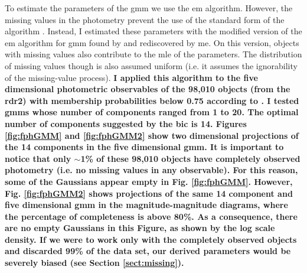 To estimate the parameters of the \gls{gmm} we use the \gls{em} algorithm. However, the missing values in the photometry prevent the use of the standard form of the algorithm \cite[see for example Chapter 9 of][]{Bishop2006}.
Instead, I estimated these parameters with the modified version of the \gls{em} algorithm for \gls{gmm} found by \citet{McMichael1996} and rediscovered by me. On this version, objects with missing values also contribute to the \gls{mle} of the parameters. The distribution of missing values though is also assumed uniform (i.e. it assumes the ignorability of the missing-value process). \textbf{I applied this algorithm to the five dimensional photometric observables of the 98,010 objects (from the \gls{rdr2}) with membership probabilities below 0.75 according to \citet{Bouy2015}. I tested \glspl{gmm} whose number of components ranged from 1 to 20. The optimal number of components suggested by the \gls{bic} is 14. Figures \ref{fig:fphGMM} and \ref{fig:fphGMM2} show two dimensional projections of the 14 components in the five dimensional \gls{gmm}. It is important to notice that only $\sim$1\% of these 98,010 objects have completely observed photometry (i.e. no missing values in any observable). For this reason, some of the Gaussians appear empty in Fig. \ref{fig:fphGMM}. However, Fig. \ref{fig:fphGMM2} shows projections of the same 14 component and five dimensional \gls{gmm} in the magnitude-magnitude diagrams, where the percentage of completeness is above 80\%. As a consequence, there are no empty Gaussians in this Figure, as shown by the log scale density. If we were to work only with the completely observed objects and discarded 99\% of the data set, our derived parameters would be severely biased (see Section \ref{sect:missing}).}

